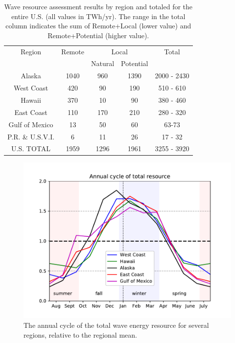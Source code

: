 \begin{table}[ht]
  \centering
  \begin{tabular}{|c|c|c|c|c|}
    \hline
    Region & Remote & \multicolumn{2}{c}{Local} & Total \\
    & & Natural & Potential & \\
    \hline
    Alaska & 1040 & 960 & 1390 & 2000 - 2430 \\
    West Coast & 420 & 90 & 190 & 510 - 610 \\
    Hawaii & 370 & 10 & 90 & 380 - 460 \\
    East Coast & 110 & 170 & 210 & 280 - 320 \\
    Gulf of Mexico & 13 & 50 & 60 & 63-73 \\
    P.R. \& U.S.V.I. & 6 & 11 & 26 & 17 - 32 \\
    \hline \hline
U.S. TOTAL & 1959 & 1296 & 1961 & 3255 - 3920 \\
\hline
  \end{tabular}
  \caption{Wave resource assessment results by region and totaled for the entire U.S. (all values in TWh/yr). The range in the total column indicates the sum of Remote+Local (lower value) and Remote+Potential (higher value). }
  \label{table:totals}
\end{table}

\begin{figure}[ht]
  \centering
  \includegraphics[width=\textwidth]{../fig/AnnualCycle01.pdf}
  \caption[Wave resource annual cycle.]{The annual cycle of the total wave energy resource for several regions, relative to the regional mean.}
  \label{fig:annual-cycle}
\end{figure}


